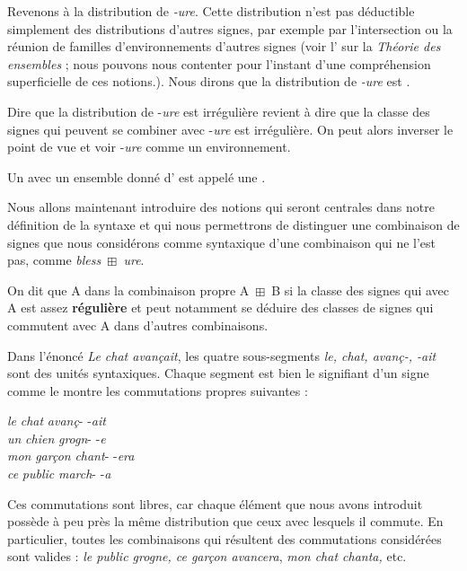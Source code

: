 Revenons à la distribution de \textit{{}-ure}. Cette distribution n’est pas déductible simplement des distributions d’autres signes, par exemple par l’intersection ou la réunion de familles d’environnements d’autres signes (voir l’ sur la \textit{Théorie des ensembles} ; nous pouvons nous contenter pour l’instant d’une compréhension superficielle de ces notions.). Nous dirons que la distribution de  \textit{{}-ure} est .

Dire que la distribution de -\textit{ure} est irrégulière revient à dire que la classe des signes qui peuvent se combiner avec -\textit{ure} est irrégulière.
On peut alors inverser le point de vue et voir -\textit{ure} comme un environnement.

{Un  avec un ensemble donné d’ est appelé une .}

Nous allons maintenant introduire des notions qui seront centrales dans notre définition de la syntaxe et qui nous permettrons de distinguer une combinaison de signes que nous considérons comme syntaxique d'une combinaison qui ne l'est pas, comme \textit{bless~}${\boxplus}$\textit{~ure}.

{On dit que A  dans la combinaison propre A~${\boxplus}$~B si la classe des signes qui  avec A est assez \textbf{régulière} et peut notamment se déduire des classes de signes qui commutent avec A dans d’autres combinaisons.}

Dans l’énoncé \textit{Le chat avançait}, les quatre sous-segments \textit{le, chat, avanç-, -ait} sont des unités syntaxiques. Chaque segment est bien le signifiant d’un signe comme le montre les commutations propres suivantes :

\ea\gllll  \textit{le}   \textit{chat}   \textit{avanç}-   -\textit{ait}\\
 \textit{un}   \textit{chien}   \textit{grogn}-   -\textit{e}\\
 \textit{mon}   \textit{garçon}   \textit{chant}-   -\textit{era}\\
 \textit{ce}   \textit{public}   \textit{march}-   -\textit{a}\\
\z

Ces commutations sont libres, car chaque élément que nous avons introduit possède à peu près la même distribution que ceux avec lesquels il commute. En particulier, toutes les combinaisons qui résultent des commutations considérées sont valides : \textit{le public grogne, ce garçon avancera}, \textit{mon chat chanta,} etc.

